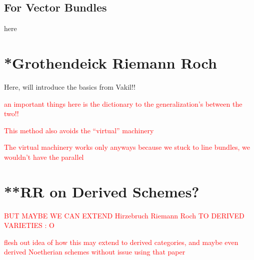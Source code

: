 \documentclass{book}
\begin{document}
\subsection{For Vector Bundles}\label{sec:HRRvecBundle}

here



\section{*Grothendeick Riemann Roch}\label{sec:GRR}


Here, will introduce the basics from Vakil!!

\textcolor{red}{an important things here is the dictionary to the generalization's between the two!!}

\textcolor{red}{This method also avoids the ``virtual'' machinery}

\textcolor{red}{The virtual machinery works only anyways because we stuck to line bundles, we wouldn't have
the parallel}



\section{**RR on Derived Schemes?}\label{sec:DRR}

\textcolor{red}{BUT MAYBE WE CAN EXTEND Hirzebruch Riemann Roch TO DERIVED VARIETIES : O}

\textcolor{red}{flesh out idea of how this may extend to derived categories, and maybe even derived Noetherian
schemes without issue using that paper}





















\newpage
\printindex
\newpage
\printbibliography
\end{document}
